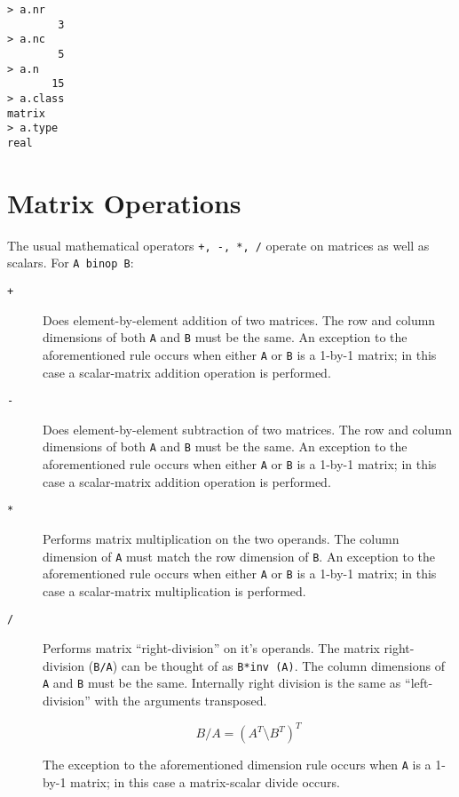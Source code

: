\begin{verbatim}
> a.nr
        3
> a.nc
        5
> a.n
       15
> a.class
matrix
> a.type
real
\end{verbatim}
  
\section{Matrix Operations}

   The usual mathematical operators {\verb|+, -, *, /|} operate on
   matrices as well as scalars. For {\verb+A binop B+}:

   \begin{description}
     \item[\verb|+|] Does element-by-element addition of two matrices.
              The row and column dimensions of both \verb+A+ and
              \verb+B+ must be the same. An exception to the
              aforementioned rule occurs when either \verb+A+ or
              \verb+B+ is a 1-by-1 matrix; in this case a
              scalar-matrix addition operation is performed.

     \item[\verb+-+] Does element-by-element subtraction of two matrices.
              The row and column dimensions of both \verb+A+ and
              \verb+B+ must be the same. An exception to the
              aforementioned rule occurs when either \verb+A+ or
              \verb+B+ is a 1-by-1 matrix; in this case a
              scalar-matrix addition operation is performed.

     \item[\verb+*+] Performs matrix multiplication on the two
              operands.  The column dimension of {\verb+A+} must match
              the row dimension of {\verb+B+}. An exception to the
              aforementioned rule occurs when either \verb+A+ or
              \verb+B+ is a 1-by-1 matrix; in this case a
              scalar-matrix multiplication is performed.

     \item[\verb+/+] Performs matrix ``right-division'' on it's operands.
              The matrix right-division (\verb+B/A+) can be thought of
              as {\verb+B*inv (A)+}. The column dimensions of \verb+A+
              and \verb+B+ must be the same. Internally right division
              is the same as ``left-division'' with the arguments
              transposed. 

		\[ B / A = ( A^T \setminus B^T )^T \]

              The exception to the aforementioned dimension rule
              occurs when \verb+A+ is a 1-by-1 matrix; in this case a
              matrix-scalar divide occurs.

   \end{description}

